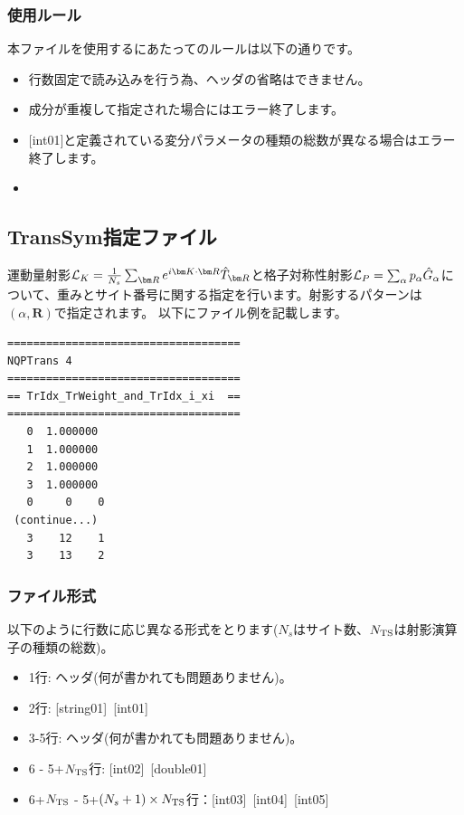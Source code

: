 \subsubsection{使用ルール}
本ファイルを使用するにあたってのルールは以下の通りです。
\begin{itemize}
\item 行数固定で読み込みを行う為、ヘッダの省略はできません。
\item 成分が重複して指定された場合にはエラー終了します。
\item $[$int01$]$と定義されている変分パラメータの種類の総数が異なる場合はエラー終了します。
\item {}
\end{itemize}



\newpage
\subsection{TransSym指定ファイル}
\label{Subsec:TransSym}

運動量射影${\cal L}_K=\frac{1}{N_s}\sum_{{\bm R}}e^{i {\bm K} \cdot{\bm R} } \hat{T}_{\bm R}$と格子対称性射影${\cal L}_P=\sum_{\alpha}p_{\alpha} \hat{G}_{\alpha}$について、重みとサイト番号に関する指定を行います。射影するパターンは$(\alpha, {\bm R})$で指定されます。
以下にファイル例を記載します。

\begin{minipage}{12.5cm}
\begin{screen}
\begin{verbatim}
====================================
NQPTrans 4  
====================================
== TrIdx_TrWeight_and_TrIdx_i_xi  ==
====================================
   0  1.000000
   1  1.000000
   2  1.000000
   3  1.000000
   0     0    0
 (continue...)
   3    12    1
   3    13    2 
\end{verbatim}
\end{screen}
\end{minipage}

\subsubsection{ファイル形式}
以下のように行数に応じ異なる形式をとります($N_s$はサイト数、$N_{\rm TS}$は射影演算子の種類の総数)。
 \begin{itemize}
   \item  1行:  ヘッダ(何が書かれても問題ありません)。
   \item  2行:   [string01]~[int01]
   \item  3-5行:  ヘッダ(何が書かれても問題ありません)。
   \item  6 - 5+$N_{\rm TS}$行: [int02]~[double01]
   \item  6+$N_{\rm TS}$ - 5+$(N_s+1) \times N_{\rm TS}$行：[int03]~[int04]~[int05]
  \end{itemize}
